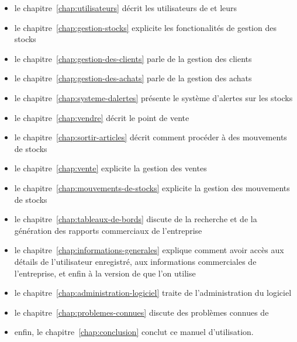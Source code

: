 \begin{itemize}[]
	\item le chapitre~\ref{chap:utilisateurs} d\'ecrit
	les utilisateurs de \yeren et leurs \roles
	     
	\item le chapitre~\ref{chap:gestion-stocks} explicite
	les fonctionalit\'es de gestion des stocks

	\item le chapitre~\ref{chap:gestion-des-clients} parle
	de la gestion des clients

	\item le chapitre~\ref{chap:gestion-des-achats} parle
	de la gestion des achats
	
	\item le chapitre~\ref{chap:systeme-dalertes}
	pr\'esente le syst\`eme d'alertes sur les stocks
	
	\item le chapitre~\ref{chap:vendre} d\'ecrit le
	point de vente
	
	\item le chapitre~\ref{chap:sortir-articles} d\'ecrit
	comment proc\'eder \`a des mouvements de stocks
	
	\item le chapitre~\ref{chap:vente} explicite la gestion
	des ventes
	
	\item le chapitre~\ref{chap:mouvements-de-stocks} explicite
	la gestion des mouvements de stocks
	
	\item le chapitre~\ref{chap:tableaux-de-bords} discute
	de la recherche et de la g\'en\'eration des rapports
	commerciaux de l'entreprise
	
	\item le chapitre~\ref{chap:informations-generales}
	explique comment avoir acc\`es aux d\'etails de
	l'utilisateur enregistr\'e, aux informations commerciales
	de l'entreprise, et enfin \`a la version de \yeren que
	l'on utilise
	
	\item le chapitre~\ref{chap:administration-logiciel}
	traite de l'administration du logiciel

	\item le chapitre~\ref{chap:problemes-connues}
	discute des probl\`emes connues de \yeren
	
	\item enfin, le chapitre~\ref{chap:conclusion} conclut
	ce manuel d'utilisation.
\end{itemize}

